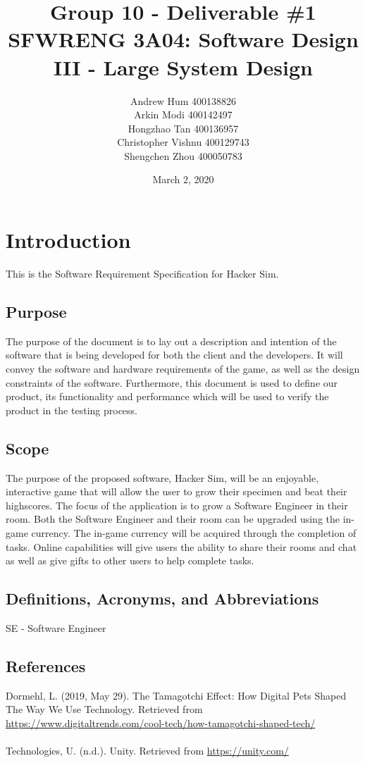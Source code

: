 \documentclass[]{article}
\title{
    \textbf{Group 10 - Deliverable \#1}\\
    \large SFWRENG 3A04: Software Design III - Large System Design
}
\author{
    Andrew Hum 400138826\\
    Arkin Modi 400142497\\
    Hongzhao Tan 400136957\\
    Christopher Vishnu 400129743\\
    Shengchen Zhou 400050783\\
}
\date{March 2, 2020}
\begin{document}
\maketitle	
\newpage

\section{Introduction}
\label{sec:introduction}
This is the Software Requirement Specification for Hacker Sim.

\subsection{Purpose}
\label{sub:purpose}
The purpose of the document is to lay out a description and intention of the 
software that is being developed for both the client and the developers. It 
will convey the software and hardware requirements of the game, as well as the 
design constraints of the software. Furthermore, this document is used to define 
our product, its functionality and performance which will be used to verify the 
product in the testing process. 

\subsection{Scope}
\label{sub:scope}
The purpose of the proposed software, Hacker Sim, will be an enjoyable, 
interactive game that will allow the user to grow their specimen and beat their 
highscores. The focus of the application is to grow a Software Engineer in their 
room. Both the Software Engineer and their room can be upgraded using the 
in-game currency. The in-game currency will be acquired through the completion 
of tasks. Online capabilities will give users the ability to share their rooms 
and chat as well as give gifts to other users to help complete tasks. 


\subsection{Definitions, Acronyms, and Abbreviations}
\label{sub:definitions_acronyms_and_abbreviations}
SE - Software Engineer

\subsection{References}
\label{sub:references}
Dormehl, L. (2019, May 29). The Tamagotchi Effect: How Digital Pets Shaped The 
Way We Use Technology. Retrieved from 
\url{https://www.digitaltrends.com/cool-tech/how-tamagotchi-shaped-tech/}
\\\\
Technologies, U. (n.d.). Unity. Retrieved from \url{https://unity.com/}
\end{document}
